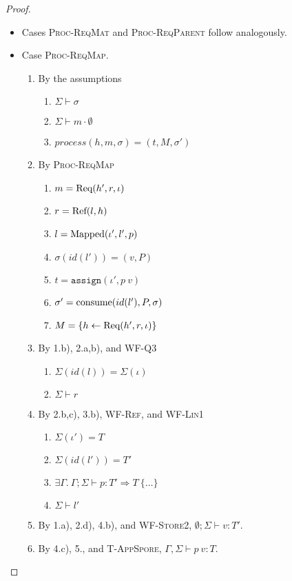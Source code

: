 \begin{proof}
\begin{itemize}
\item Cases \textsc{Proc-ReqMat} and \textsc{Proc-ReqParent} follow analogously.

\item Case \textsc{Proc-ReqMap}.
\begin{enumerate}
\item By the assumptions
  \begin{enumerate}[label=(\alph*)]
  \item $\Sigma \vdash \sigma$
  \item $\Sigma \vdash m \cdot \emptyset$
  \item $process(h, m, \sigma) = (t, M, \sigma')$
  \end{enumerate}
\item By \textsc{Proc-ReqMap}
  \begin{enumerate}[label=(\alph*)]
  \item $m = {\textrm{Req}(h', r, \iota)}$
  \item $r = {\textrm{Ref}(l, h)}$
  \item $l = {\textrm{Mapped}(\iota', l', p)}$
  \item $\sigma(id(l')) = (v, P)$
  \item $t = \texttt{assign}(\iota', p~v)$
  \item $\sigma' = {\textrm{consume}(id(l'), P, \sigma)}$
  \item $M = \{ h \leftarrow {\textrm{Req}(h', r, \iota)} \}$
  \end{enumerate}
\item By 1.b), 2.a,b), and \textsc{WF-Q3}
  \begin{enumerate}[label=(\alph*)]
  \item $\Sigma(id(l)) = \Sigma(\iota)$
  \item $\Sigma \vdash r$
  \end{enumerate}
\item By 2.b,c), 3.b), \textsc{WF-Ref}, and \textsc{WF-Lin1}
  \begin{enumerate}[label=(\alph*)]
  \item $\Sigma(\iota') = T$
  \item $\Sigma(id(l')) = T'$
  \item $\exists \Gamma.~\Gamma ; \Sigma \vdash p : T' \Rightarrow T~\{\ldots\}$
  \item $\Sigma \vdash l'$
  \end{enumerate}
\item By 1.a), 2.d), 4.b), and \textsc{WF-Store2}, $\emptyset ; \Sigma \vdash v : T'$.
\item By 4.c), 5., and \textsc{T-AppSpore}, $\Gamma, \Sigma \vdash p~v : T$.

\end{enumerate}
\end{itemize}
\end{proof}
